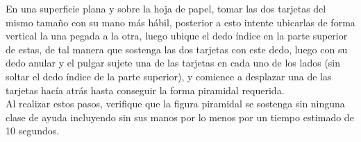 \documentclass{article}
\begin{document}
En una superficie plana y sobre la hoja de papel, tomar las dos tarjetas del mismo tamaño con su mano más hábil, posterior a esto intente ubicarlas de forma vertical la una pegada a la otra, luego ubique el dedo índice en la parte superior de estas, de tal manera que sostenga las dos tarjetas con este dedo, luego con su dedo anular y el pulgar sujete una de las tarjetas en cada uno de los lados (sin soltar el dedo índice de la parte superior), y comience a desplazar una de las tarjetas hacía atrás hasta conseguir la forma piramidal requerida.\\

Al realizar estos pasos, verifique que la figura piramidal se sostenga sin ninguna clase de ayuda incluyendo sin sus manos por lo menos por un tiempo estimado de 10 segundos.

\end{document}
